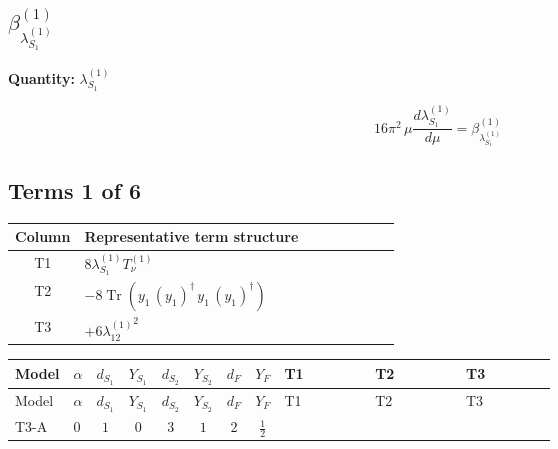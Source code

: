 \documentclass[8pt]{article}
\begin{document}
\begin{landscape}
\section*{$\beta_{\lambda_{S_1}^{(1)}}^{(1)}$}
\noindent\textbf{Quantity: }$\lambda_{S_1}^{(1)}$\par\smallskip
\[16\pi^2\,\mu\frac{d \lambda_{S_1}^{(1)}}{d\mu}=\beta_{\lambda_{S_1}^{(1)}}^{(1)}\]
\subsection*{Terms 1 of 6}
\begin{center}
\begin{tabular}{@{}c >{\raggedright\arraybackslash}p{0.82\linewidth}@{}}
\toprule
Column & Representative term structure \\
\midrule
T1 & \(\displaystyle 8 {\lambda_{S_1}^{(1)}} T_{\nu}^{(1)}\) \\
\midrule
T2 & \(\displaystyle -8 \operatorname{Tr}\!\left({y_1}\,\left({y_1}\right)^{\dagger}\,{y_1}\,\left({y_1}\right)^{\dagger}\right)\) \\
\midrule
T3 & \(\displaystyle +6 {\lambda_{12}^{(1)}}^2\) \\
\midrule
\bottomrule
\end{tabular}
\end{center}
\smallskip
\tiny
\begin{longtable}{@{}llcccccc >{\raggedright\arraybackslash}p{0.21\linewidth} >{\raggedright\arraybackslash}p{0.21\linewidth} >{\raggedright\arraybackslash}p{0.21\linewidth}@{}}
\toprule
Model & $\alpha$ & $d_{S_1}$ & $Y_{S_1}$ & $d_{S_2}$ & $Y_{S_2}$ & $d_F$ & $Y_F$ & T1 & T2 & T3 \\
\midrule
\endfirsthead
\toprule
Model & $\alpha$ & $d_{S_1}$ & $Y_{S_1}$ & $d_{S_2}$ & $Y_{S_2}$ & $d_F$ & $Y_F$ & T1 & T2 & T3 \\
\midrule
\endhead
T3-A & $0$ & $1$ & $0$ & $3$ & $1$ & $2$ & $\frac{1}{2}$ & \scriptsize\adjustbox{max width=\linewidth}{$\begin{gathered} 8 {\lambda_{S_1}^{(1)}} T_{\nu}^{(1)}\end{gathered}$} & \scriptsize\adjustbox{max width=\linewidth}{$\begin{gathered} -8 \operatorname{Tr}\!\left({y_1}\,\left({y_1}\right)^{\dagger}\,{y_1}\,\left({y_1}\right)^{\dagger}\right)\end{gathered}$} & \scriptsize\adjustbox{max width=\linewidth}{$\begin{gathered} +6 {\lambda_{12}^{(1)}}^2\end{gathered}$} \\

\end{longtable}
\end{landscape}
\end{document}
